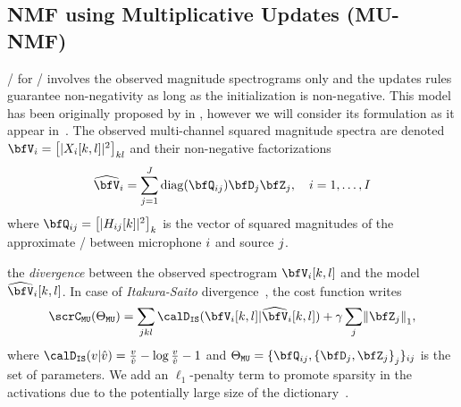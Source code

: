\subsection{NMF using Multiplicative Updates (MU-NMF)}\label{sec:separake:mu}
\MU/ for \NMF/ involves the observed magnitude spectrograms only and the updates rules guarantee non-negativity as long as the initialization is non-negative.
This model has been originally proposed by in , however we will consider its formulation as it appear in~.
The observed multi-channel squared magnitude spectra are denoted $\mV_\idxMic = \klist{\powerOf{\MIC_\idxMic[k,l]}}_{kl}$ and their non-negative factorizations
\begin{equation}
    \label{eq:mu_nmf}
    \wh{\mV}_\idxMic = \sum_{\idxSrc=1}^{\numSrcs} \diag(\vQ_{\idxMicSrc}) \mD_\idxSrc \mZ_\idxSrc , \quad \idxMic=1,\ldots,\numMics
\end{equation}
where $\vQ_{\idxMicSrc} = \klist{\powerOf{\FLT_{\idxMicSrc}[k]}}_k$ is the vector of squared magnitudes of the approximate \RTF/ between microphone $i$ and source $j$.

 the  \textit{divergence} between the observed spectrogram $\mV_{\idxMic}[k,l]$ and the model $\wh{\mV}_{\idxMic}[k,l]$.
In case of \textit{Itakura-Saito} divergence~, the cost function writes
\begin{equation}
    \scrC_{\mathtt{MU}}(\Theta_{\mathtt{MU}}) = \sum_{\idxSrc k l} \calD_{\mathtt{IS}}(\mV_{\idxMic}[k,l] | \wh{\mV}_{\idxMic}[k,l])
    + \gamma \sum_\idxSrc \kvvbar{\mZ_\idxSrc}_1,
\end{equation}
where $\calD_{\mathtt{IS}}( v | \hat{v} ) = \frac{v}{\hat{v}} - \log \frac{v}{\hat{v}} - 1$ and $\Theta_{\mathtt{MU}} = \{\vQ_{\idxMicSrc}, \set{\mD_\idxSrc, \mZ_\idxSrc}_\idxSrc\}_{\idxMicSrc}$ is the set of parameters.
We add an $\ell_1$-penalty term to promote sparsity in the activations due to the potentially large size of the dictionary~.

